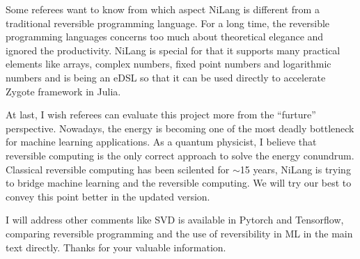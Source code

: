 \documentclass{article}
\begin{document}
Some referees want to know from which aspect NiLang is different from a traditional reversible programming language.
For a long time, the reversible programming languages concerns too much about theoretical elegance and ignored the productivity.
NiLang is special for that it supports many practical elements like arrays, complex numbers, fixed point numbers and logarithmic numbers and is being an eDSL so that it can be used directly to accelerate Zygote framework in Julia.

At last, I wish referees can evaluate this project more from the ``furture'' perspective.
Nowadays, the energy is becoming one of the most deadly bottleneck for machine learning applications.
As a quantum physicist, I believe that reversible computing is the only correct approach to solve the energy conundrum.
Classical reversible computing has been scilented for $\sim$15 years, NiLang is trying to bridge machine learning and the reversible computing.
We will try our best to convey this point better in the updated version.

I will address other comments like SVD is available in Pytorch and Tensorflow,
comparing reversible programming and the use of reversibility in ML in the main text directly. Thanks for your valuable information.



\end{document}

